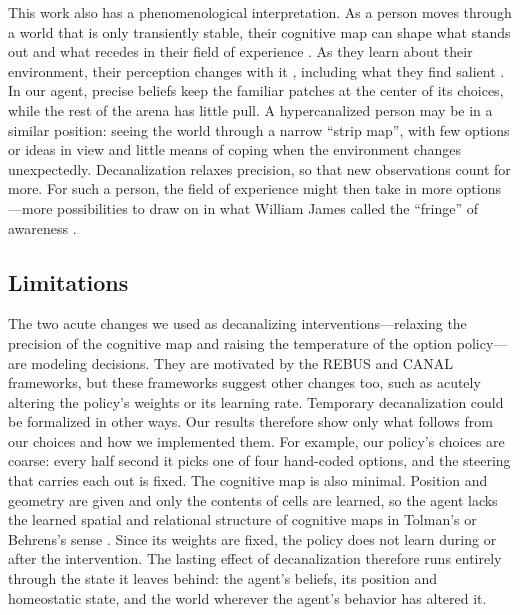 \documentclass[12pt,fleqn]{article}
\begin{document}
This work also has a phenomenological interpretation. As a person moves through a world that is only transiently stable, their cognitive map can shape what stands out and what recedes in their field of experience \citep{gurwitsch_field_1964, yoshimi_extending_2015}. As they learn about their environment, their perception changes with it \citep{yoshimi_husserlian_2016}, including what they find salient \citep{clingoDisintegrationReintegrationModelPsychological2025}. In our agent, precise beliefs keep the familiar patches at the center of its choices, while the rest of the arena has little pull. A hypercanalized person may be in a similar position: seeing the world through a narrow ``strip map'', with few options or ideas in view and little means of coping when the environment changes unexpectedly. Decanalization relaxes precision, so that new observations count for more. For such a person, the field of experience might then take in more options---more possibilities to draw on in what William James called the ``fringe'' of awareness \citep{james_principles_1890, mangan_taking_1993}.

\subsection{Limitations}

The two acute changes we used as decanalizing interventions---relaxing the precision of the cognitive map and raising the temperature of the option policy---are modeling decisions. They are motivated by the REBUS and CANAL frameworks, but these frameworks suggest other changes too, such as acutely altering the policy's weights or its learning rate. Temporary decanalization could be formalized in other ways. Our results therefore show only what follows from our choices and how we implemented them. For example, our policy's choices are coarse: every half second it picks one of four hand-coded options, and the steering that carries each out is fixed. The cognitive map is also minimal. Position and geometry are given and only the contents of cells are learned, so the agent lacks the learned spatial and relational structure of cognitive maps in Tolman's or Behrens's sense \citep{tolman_cognitive_1948, behrens_cognitive_2018}. Since its weights are fixed, the policy does not learn during or after the intervention. The lasting effect of decanalization therefore runs entirely through the state it leaves behind: the agent's beliefs, its position and homeostatic state, and the world wherever the agent's behavior has altered it.
\end{document}
